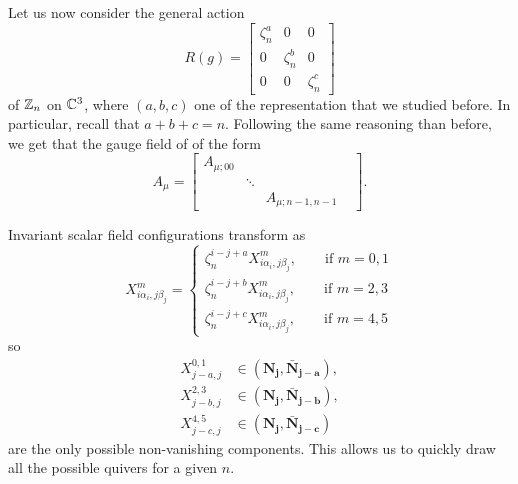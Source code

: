 \documentclass[a4paper,10pt]{article}
\begin{document}
           Let us now consider the general action
           \begin{equation}
                R(g)=
                \begin{bmatrix}
                    \zeta^a_n & 0 & 0\\
                    0 & \zeta^b_n & 0\\
                    0 & 0 & \zeta^c_n
                \end{bmatrix}
           \end{equation}
           of $\mathbb{Z}_n$ on $\mathbb{C}^3$, where $(a,b,c)$ one of the representation that we studied before. In particular, recall that $a+b+c=n$. Following the same reasoning than before, we get that the gauge field of of the form
           \begin{equation}
               A_\mu=
               \begin{bmatrix}
                   A_{\mu;00} & & \\
                   & \ddots & & \\
                   & & A_{\mu;n-1,n-1}
               \end{bmatrix}.
           \end{equation}

           Invariant scalar field configurations transform as
           \begin{equation}
               X^m_{i\alpha_i,j\beta_j}=
               \begin{cases}
                   \zeta^{i-j+a}_nX^m_{i\alpha_i,j\beta_j},\qquad \text{if }m=0,1\\
                   \zeta^{i-j+b}_nX^m_{i\alpha_i,j\beta_j},\qquad \text{if }m=2,3\\
                   \zeta^{i-j+c}_nX^m_{i\alpha_i,j\beta_j},\qquad \text{if }m=4,5
               \end{cases}
           \end{equation}
           so
           \begin{align}
               X^{0,1}_{j-a,j} &\in (\boldsymbol{\textbf{N}_j},\boldsymbol{\bar{\textbf{N}}_{j-a}}),\\
               X^{2,3}_{j-b,j} &\in (\boldsymbol{\textbf{N}_j},\boldsymbol{\bar{\textbf{N}}_{j-b}}),\\
               X^{4,5}_{j-c,j} &\in (\boldsymbol{\textbf{N}_j},\boldsymbol{\bar{\textbf{N}}_{j-c}})
           \end{align}
           are the only possible non-vanishing components. This allows us to quickly draw all the possible quivers for a given $n$.
        
\end{document}
